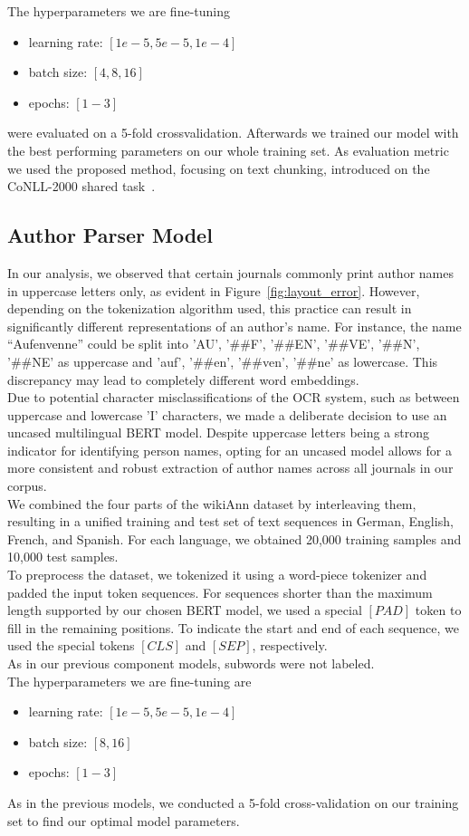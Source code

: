 The hyperparameters we are fine-tuning
\begin{itemize}
    \item learning rate:  $[1e-5, 5e-5, 1e-4]$
    \item batch size: $[4, 8, 16]$
    \item epochs: $[1-3]$
\end{itemize}
were evaluated on a 5-fold crossvalidation. Afterwards we trained our model with the best performing parameters on our whole training set. As evaluation metric we used the proposed method, focusing on text chunking, introduced on the CoNLL-2000 shared task~\cite{tjong-kim-sang-buchholz-2000-introduction}.

\subsection{Author Parser Model}
In our analysis, we observed that certain journals commonly print author names in uppercase letters only, as evident in Figure~\ref{fig:layout_error}. However, depending on the tokenization algorithm used, this practice can result in significantly different representations of an author's name. For instance, the name \enquote{Aufenvenne} could be split into 'AU', '\#\#F', '\#\#EN', '\#\#VE', '\#\#N', '\#\#NE' as uppercase and 'auf', '\#\#en', '\#\#ven', '\#\#ne' as lowercase. This discrepancy may lead to completely different word embeddings.\\
Due to potential character misclassifications of the OCR system, such as between uppercase and lowercase 'I' characters, we made a deliberate decision to use an uncased multilingual BERT model. Despite uppercase letters being a strong indicator for identifying person names, opting for an uncased model allows for a more consistent and robust extraction of author names across all journals in our corpus.\\

We combined the four parts of the wikiAnn dataset by interleaving them, resulting in a unified training and test set of text sequences in German, English, French, and Spanish. For each language, we obtained 20,000 training samples and 10,000 test samples.\\
To preprocess the dataset, we tokenized it using a word-piece tokenizer and padded the input token sequences. For sequences shorter than the maximum length supported by our chosen BERT model, we used a special $[PAD]$ token to fill in the remaining positions. To indicate the start and end of each sequence, we used the special tokens $[CLS]$ and $[SEP]$, respectively.\\
As in our previous component models, subwords were not labeled.\\
The hyperparameters we are fine-tuning are
\begin{itemize}
    \item learning rate:  $[1e-5, 5e-5, 1e-4]$
    \item batch size: $[8, 16]$
    \item epochs: $[1-3]$
\end{itemize}
As in the previous models, we conducted a 5-fold cross-validation on our training set to find our optimal model parameters.

